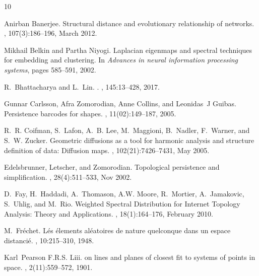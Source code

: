 \documentclass{amsart}
\begin{document}
\small
%
\begin{thebibliography}{10}

Anirban Banerjee.
\newblock Structural distance and evolutionary relationship of networks.
, 107(3):186--196, March 2012.

Mikhail Belkin and Partha Niyogi.
\newblock Laplacian eigenmaps and spectral techniques for embedding and
  clustering.
\newblock In {\em Advances in neural information processing systems}, pages
  585--591, 2002.

R.~{Bhattacharya} and L.~{Lin}.
.
,
  145:13--428, 2017.

Gunnar Carlsson, Afra Zomorodian, Anne Collins, and Leonidas~J Guibas.
\newblock Persistence barcodes for shapes.
, 11(02):149--187, 2005.

R.~R. Coifman, S.~Lafon, A.~B. Lee, M.~Maggioni, B.~Nadler, F.~Warner, and
  S.~W. Zucker.
\newblock Geometric diffusions as a tool for harmonic analysis and structure
  definition of data: {Diffusion} maps.
,
  102(21):7426--7431, May 2005.

Edelsbrunner, Letscher, and Zomorodian.
\newblock Topological persistence and simplification.
, 28(4):511--533, Nov 2002.

D.~Fay, H.~Haddadi, A.~Thomason, A.W. Moore, R.~Mortier, A.~Jamakovic,
  S.~Uhlig, and M.~Rio.
\newblock Weighted {Spectral} {Distribution} for {Internet} {Topology}
  {Analysis}: {Theory} and {Applications}.
, 18(1):164--176, February
  2010.

M.~Fr\'echet.
\newblock L\'es \'elements al\'eatoires de nature quelconque dans un espace
  distanci\'e.
, 10:215--310, 1948.

Karl~Pearson F.R.S.
\newblock Liii. on lines and planes of closest fit to systems of points in
  space.
, 2(11):559--572, 1901.


\end{thebibliography}
\end{document}
